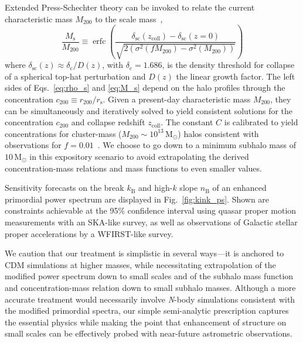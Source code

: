 \documentclass[prd,aps,twocolumn,nofootinbib,superscriptaddress,preprintnumbers,balancelastpage,longbibliography,floatfix]{revtex4-1}
\begin{document}
Extended Press-Schechter theory can be invoked to relate the current characteristic mass $M_{200}$ to the scale mass~\cite{Lacey:1994su},
\begin{equation}
\frac{{M}_\mathrm{s}}{{M}_{200}} \equiv \operatorname{erfc}\left(\frac{\delta_{\mathrm{sc}}\left(z_\mathrm{coll}\right)-\delta_{\mathrm{sc}}\left(z=0\right)}{\sqrt{2\left(\sigma^{2}\left(f {M}_{200}\right)-\sigma^{2}\left({M}_{200}\right)\right)}}\right)
\label{eq:M_s}
\end{equation}
where $\delta_{\mathrm{sc}}(z) \approx \delta_\mathrm{c} / D(z)$, with $\delta_\mathrm{c} = 1.686$, is the density threshold for collapse of a spherical top-hat perturbation and $D(z)$ the linear growth factor. The left sides of Eqs.~\eqref{eq:rho_s} and \eqref{eq:M_s} depend on the halo profiles through the concentration $c_{200} \equiv r_{200}/r_\mathrm{s}$. Given a present-day characteristic mass $M_{200}$, they can be simultaneously and iteratively solved to yield consistent solutions for the concentration $c_{200}$ and collapse redshift $z_\mathrm{coll}$. The constant $C$ is calibrated to yield concentrations for cluster-mass ($M_{200}\sim10^{13}\,\mathrm{M}_\odot$) halos consistent with observations for $f = 0.01$~\cite{Ludlow:2016ifl}. We choose to go down to a minimum subhalo mass of $10\,\mathrm M_\odot$ in this expository scenario to avoid extrapolating the derived concentration-mass relations and mass functions to even smaller values.

Sensitivity forecasts on the break $k_\mathrm{B}$ and high-$k$ slope $n_\mathrm{B}$ of an enhanced primordial power spectrum are displayed in Fig.~\ref{fig:kink_ps}. Shown are constraints achievable at the 95\% confidence interval using quasar proper motion measurements with an SKA-like survey, as well as observations of Galactic stellar proper accelerations by a WFIRST-like survey.

We caution that our treatment is simplistic in several ways---it is anchored to CDM simulations at higher masses, while necessitating extrapolation of the modified power spectrum down to small scales and of the subhalo mass function and concentration-mass relation down to small subhalo masses. Although a more accurate treatment would necessarily involve \emph{N}-body simulations consistent with the modified primordial spectra, our simple semi-analytic prescription captures the essential physics while making the point that enhancement of structure on small scales can be effectively probed with near-future astrometric observations.
\end{document}
